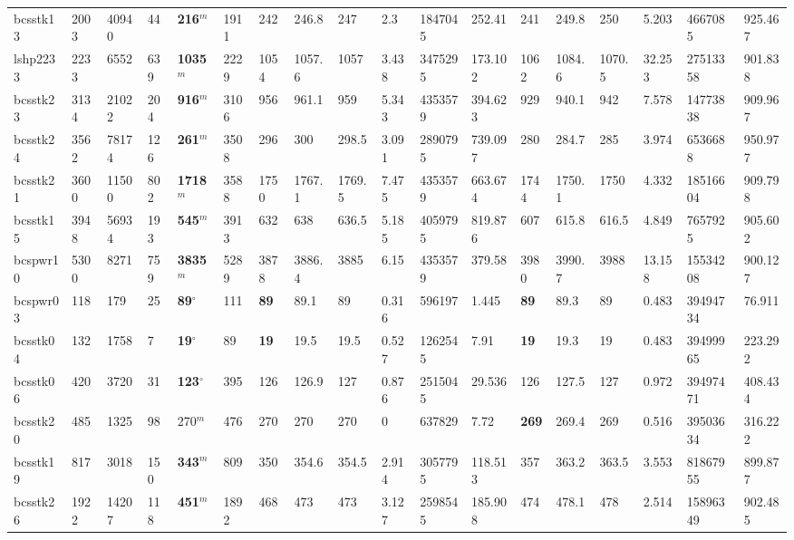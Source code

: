 \begin{table}[h!]
{\begin{tabular}{llllllllllllllllll}
            bcsstk13 & 2003 & 40940 & 44 & \textbf{216}$^{m}$ & 1911 & 242 & 246.8 & 247 & 2.3 & 1847045 & 252.41 & 241 & 249.8 & 250 & 5.203 & 4667085 & 925.467 \\
            lshp2233 & 2233 & 6552 & 639 & \textbf{1035}$^{m}$ & 2229 & 1054 & 1057.6 & 1057 & 3.438 & 3475295 & 173.102 & 1062 & 1084.6 & 1070.5 & 32.253 & 27513358 & 901.838 \\
            bcsstk23 & 3134 & 21022 & 204 & \textbf{916}$^{m}$ & 3106 & 956 & 961.1 & 959 & 5.343 & 4353579 & 394.623 & 929 & 940.1 & 942 & 7.578 & 14773838 & 909.967 \\
            bcsstk24 & 3562 & 78174 & 126 & \textbf{261}$^{m}$ & 3508 & 296 & 300 & 298.5 & 3.091 & 2890795 & 739.097 & 280 & 284.7 & 285 & 3.974 & 6536688 & 950.977 \\
            bcsstk21 & 3600 & 11500 & 802 & \textbf{1718}$^{m}$ & 3588 & 1750 & 1767.1 & 1769.5 & 7.475 & 4353579 & 663.674 & 1744 & 1750.1 & 1750 & 4.332 & 18516604 & 909.798 \\
            bcsstk15 & 3948 & 56934 & 193 & \textbf{545}$^{m}$ & 3913 & 632 & 638 & 636.5 & 5.185 & 4059795 & 819.876 & 607 & 615.8 & 616.5 & 4.849 & 7657925 & 905.602 \\
            bcspwr10 & 5300 & 8271 & 759 & \textbf{3835}$^{m}$ & 5289 & 3878 & 3886.4 & 3885 & 6.15 & 4353579 & 379.58 & 3980 & 3990.7 & 3988 & 13.158 & 15534208 & 900.127 \\
            bcspwr03 & 118 & 179 & 25 & \textbf{89}$^{\circ}$ & 111 & \textbf{89} & 89.1 & 89 & 0.316 & 596197 & 1.445 & \textbf{89} & 89.3 & 89 & 0.483 & 39494734 & 76.911 \\
            bcsstk04 & 132 & 1758 & 7 & \textbf{19}$^{\circ}$ & 89 & \textbf{19} & 19.5 & 19.5 & 0.527 & 1262545 & 7.91 & \textbf{19} & 19.3 & 19 & 0.483 & 39499965 & 223.292 \\
            bcsstk06 & 420 & 3720 & 31 & \textbf{123}$^{\circ}$ & 395 & 126 & 126.9 & 127 & 0.876 & 2515045 & 29.536 & 126 & 127.5 & 127 & 0.972 & 39497471 & 408.434 \\
            bcsstk20 & 485 & 1325 & 98 & 270$^{m}$ & 476 & 270 & 270 & 270 & 0 & 637829 & 7.72 & \textbf{269} & 269.4 & 269 & 0.516 & 39503634 & 316.222 \\
            bcsstk19 & 817 & 3018 & 150 & \textbf{343}$^{m}$ & 809 & 350 & 354.6 & 354.5 & 2.914 & 3057795 & 118.513 & 357 & 363.2 & 363.5 & 3.553 & 81867955 & 899.877 \\
            bcsstk26 & 1922 & 14207 & 118 & \textbf{451}$^{m}$ & 1892 & 468 & 473 & 473 & 3.127 & 2598545 & 185.908 & 474 & 478.1 & 478 & 2.514 & 15896349 & 902.485 \\
            \bottomrule
        \end{tabular}
    }{
}
\end{table}

